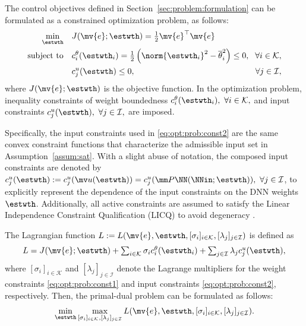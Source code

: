 \documentclass[letterpaper, journal]{IEEEtran}
\begin{document}
The control objectives defined in Section~\ref{sec:problem:formulation} can be formulated as a constrained optimization problem, as follows:
\begin{subequations} \label{eq:opt:prob} 
  \begin{align} 
    \min_{\estwth} \quad 
    & 
    J(\mv{e};\estwth)
    = 
    \tfrac{1}{2} \mv{e}^\top \mv{e} 
    &
    \label{eq:opt:prob:obj} 
    \\ 
    \text{subject to} \quad  
    & 
    c^{\theta}_i(\estwth_i)=\tfrac{1}{2}
    \left(
      \norm{\estwth_i}^2
      -
      \overline{\theta}_i^2 
    \right)
    \le 0, 
    \!
    &
    \!
    \forall i\in\mathcal{K} 
    ,
    \label{eq:opt:prob:const1} 
    \\ 
    & 
    c^{u}_j(\estwth)
    \le 0, 
    &
    \forall j\in\mathcal{I} 
    \label{eq:opt:prob:const2} 
    ,
  \end{align}%
\end{subequations}
where $J(\mv{e};\estwth)$ is the objective function.
In the optimization problem, inequality constraints of weight boundedness $c^{\theta}_i(\estwth_i),\ \forall i\in\mathcal{K},$ and input constraints $c^{u}_j(\estwth),\ \forall j\in\mathcal{I},$ are imposed.

Specifically, the input constraints used in \eqref{eq:opt:prob:const2} are the same convex constraint functions that characterize the admissible input set in Assumption~\ref{assum:sat}.
With a slight abuse of notation, the composed input constraints are denoted by
$c_j^u(\estwth):=c_j^u(\mv u(\estwth))=c_j^u(\mm P\NN(\NNin;\estwth)),\ \forall j\in\mathcal I$, to explicitly represent the dependence of the input constraints on the DNN weights $\estwth$.
Additionally, all active constraints are assumed to satisfy the Linear Independence Constraint Qualification (LICQ) to avoid degeneracy \cite[pp. 465--467]{Nocedal:2006aa}.

The Lagrangian function $L:=L(\mv{e},\estwth,[\sigma_i]_{i\in\mathcal{K}},[\lambda_j]_{j\in\mathcal I})$ is defined as
\begin{equation}
  L
  = 
  J(\mv{e};\estwth) 
  + 
  \textstyle\sum_{i\in\mathcal{K}}
  \sigma_{i}
  c^{\theta}_{i}(\estwth_i)
  +
  \textstyle\sum_{j\in\mathcal I}
  \lambda_{j}
  c^{u}_{j}(\estwth)
  ,
  \label{eq:lagrangian}
\end{equation}
where $[\sigma_i]_{i\in\mathcal{K}}$ and $[\lambda_j]_{j\in\mathcal{I}}$ denote the Lagrange multipliers for the weight constraints \eqref{eq:opt:prob:const1} and input constraints \eqref{eq:opt:prob:const2}, respectively.
Then, the primal-dual problem can be formulated as follows:
\begin{equation} \label{eq:opt:prob:saddle}
  \min_{\estwth}
  \max_{
    [\sigma_i]_{i\in\mathcal{K}}
    ,
    [\lambda_j]_{j\in\mathcal{I}}
  } 
  L(\mv{e},\estwth,[\sigma_i]_{i\in\mathcal{K}},[\lambda_j]_{j\in\mathcal I})
  .
\end{equation}
\end{document}
